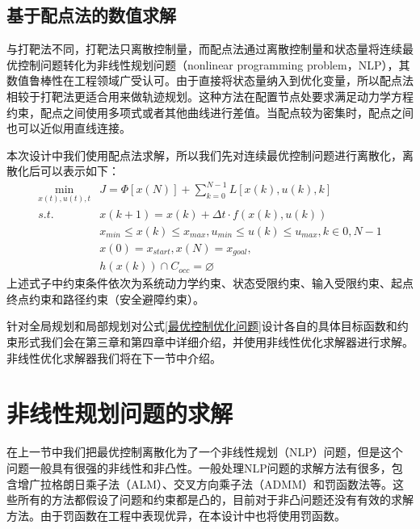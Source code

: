 \documentclass[master,academic]{ysuthesis} %
\begin{document}
	\subsection{基于配点法的数值求解}
	与打靶法不同，打靶法只离散控制量，而配点法通过离散控制量和状态量将连续最优控制问题转化为非线性规划问题（nonlinear programming problem，NLP），其数值鲁棒性在工程领域广受认可\cite{aluru2000point}。由于直接将状态量纳入到优化变量，所以配点法相较于打靶法更适合用来做轨迹规划。这种方法在配置节点处要求满足动力学方程约束，配点之间使用多项式或者其他曲线进行差值。当配点较为密集时，配点之间也可以近似用直线连接。

	本次设计中我们使用配点法求解，所以我们先对连续最优控制问题进行离散化，离散化后可以表示如下：
	\begin{equation}
	\begin{aligned}
		\min_{x(t),u(t),t} &J = \Phi[x(N)]+\sum_{k=0}^{N-1}L[x(k),u(k),k]\\
			s.t. \ \ \ &x(k+1) = x(k)+ \Delta t \cdot f(x(k),u(k))\\
			&x_{min}\le x(k) \le x_{max},u_{min}\le u(k) \le u_{max},k \in{0,N-1}\\
			&x(0)=x_{start},x(N)=x_{goal},\\
			&h(x(k))\cap C_{occ}=\varnothing 
	\end{aligned}
	\label{最优控制优化问题}
	\end{equation}
	上述式子中约束条件依次为系统动力学约束、状态受限约束、输入受限约束、起点终点约束和路径约束（安全避障约束）。

	针对全局规划和局部规划对公式\ref{最优控制优化问题}设计各自的具体目标函数和约束形式我们会在第三章和第四章中详细介绍，并使用非线性优化求解器进行求解。非线性优化求解器我们将在下一节中介绍。

	\section{非线性规划问题的求解}
	在上一节中我们把最优控制离散化为了一个非线性规划（NLP）问题，但是这个问题一般具有很强的非线性和非凸性。一般处理NLP问题的求解方法有很多，包含增广拉格朗日乘子法（ALM）\cite{rockafellar1974augmented}、交叉方向乘子法（ADMM）\cite{wei2012distributed}和罚函数法\cite{yeniay2005penalty}等。这些所有的方法都假设了问题和约束都是凸的，目前对于非凸问题还没有有效的求解方法。由于罚函数在工程中表现优异，在本设计中也将使用罚函数。
\end{document}
